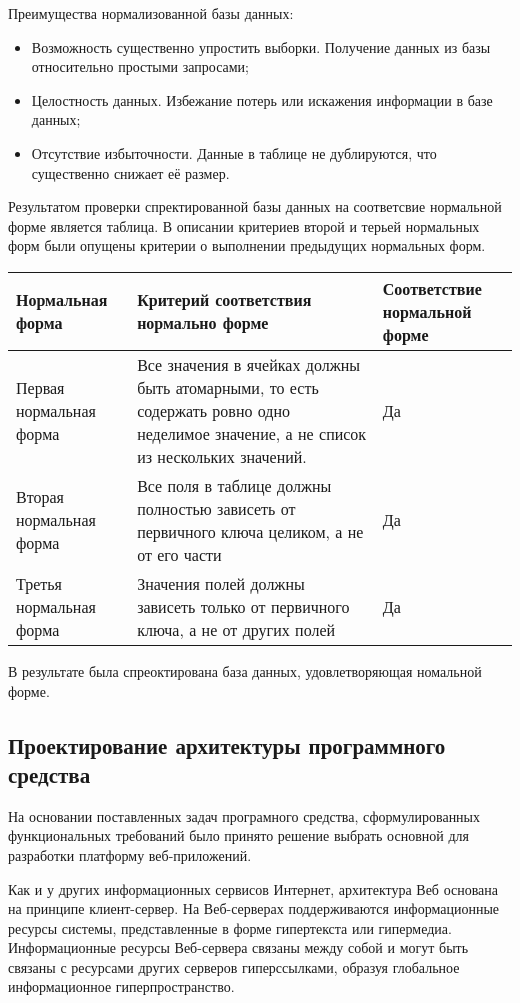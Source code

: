 Преимущества нормализованной базы данных:
\begin{itemize}
    \item Возможность существенно упростить выборки. Получение данных из базы относительно простыми запросами;
    \item Целостность данных. Избежание потерь или искажения информации в базе данных;
    \item Отсутствие избыточности. Данные в таблице не дублируются, что существенно снижает её размер.
\end{itemize}

Результатом проверки спректированной базы данных на соответсвие нормальной форме является таблица.
В описании критериев второй и терьей нормальных форм были опущены критерии о выполнении предыдущих нормальных форм.

\begin{tabular}{ | p{3cm} | p{6cm} | p{3cm} | }
    \hline
    Нормальная форма  & Критерий соответствия нормально форме & Соответствие нормальной форме \\ \hline
    Первая нормальная форма & Все значения в ячейках должны быть атомарными, то есть содержать ровно одно неделимое значение, а не список из нескольких значений. & Да  \\ \hline
    Вторая нормальная форма & Все поля в таблице должны полностью зависеть от первичного ключа целиком, а не от его части & Да  \\ \hline
    Третья нормальная форма & Значения полей должны зависеть только от первичного ключа, а не от других полей & Да  \\
    \hline
\end{tabular}

В результате была спреоктирована база данных, удовлетворяющая номальной форме.

\subsection{Проектирование архитектуры программного средства}
На основании поставленных задач програмного средства, сформулированных функциональных требований было принято решение выбрать основной для разработки платформу веб-приложений.

Как и у других информационных сервисов Интернет, архитектура Веб основана на принципе клиент-сервер.
На Веб-серверах поддерживаются информационные ресурсы системы, представленные в форме гипертекста или гипермедиа.
Информационные ресурсы Веб-сервера связаны между собой и могут быть связаны с ресурсами других серверов гиперссылками, образуя глобальное информационное гиперпространство.

